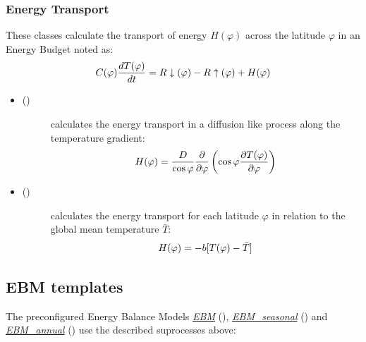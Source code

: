 \documentclass[a4paper,10pt,english]{sphinxmanual}
\begin{document}
\subsubsection{Energy Transport}
\label{models:energy-transport}
These classes calculate the transport of energy \(H(\varphi)\) across the latitude \(\varphi\) in an Energy Budget noted as:
\begin{gather}
\begin{split}C(\varphi) \frac{dT(\varphi)}{dt} = R\downarrow (\varphi) - R\uparrow (\varphi) + H(\varphi)\end{split}\notag
\end{gather}\begin{itemize}
\item {} \begin{description}
\item[{{\hyperref[api/climlab.dynamics:climlab.dynamics.diffusion.MeridionalDiffusion]{\emph{}}} ()}] \leavevmode
calculates the energy transport in a diffusion like process along the temperature gradient:
\begin{gather}
\begin{split}H(\varphi) = \frac{D}{\cos \varphi}\frac{\partial}{\partial \varphi} \left( \cos\varphi \frac{\partial T(\varphi)}{\partial \varphi} \right)\end{split}\notag
\end{gather}
\end{description}

\item {} \begin{description}
\item[{{\hyperref[api/climlab.dynamics:climlab.dynamics.budyko_transport.BudykoTransport]{\emph{}}} ()}] \leavevmode
calculates the energy transport for each latitude \(\varphi\) in relation to the global mean temperature \(\bar{T}\):
\begin{gather}
\begin{split}H(\varphi) = - b [T(\varphi) - \bar{T}]\end{split}\notag
\end{gather}
\end{description}

\end{itemize}


\subsection{EBM templates}
\label{models:ebm-templates}
The preconfigured Energy Balance Models {\hyperref[models:ebm]{\emph{EBM}}} (), {\hyperref[models:ebm\string-seasonal]{\emph{EBM\_seasonal}}} () and {\hyperref[models:ebm\string-annual]{\emph{EBM\_annual}}} () use the described suprocesses above:
\end{document}
